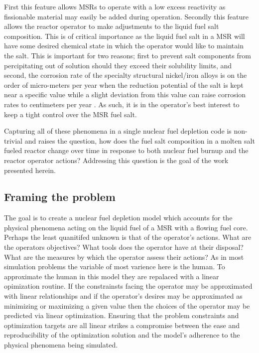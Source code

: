 First this feature allows MSRs to operate with a
low excess reactivity as fissionable material may easily be added during
operation. Secondly this feature allows the reactor operator to make adjustments
to the liquid fuel salt composition. This is of critical importance as the 
liquid fuel salt in a MSR will have some desired chemical state
in which the operator would like to maintain the salt. This is important for two
reasons; first to prevent salt components from percipitating out of solution
should they exceed their solubility limits, and second, the corrosion rate of 
the specialty structural nickel/iron alloys is on the order of
micro-meters per year when the reduction potential of the salt is kept near
a specific value while a slight deviation from this value can raise corrosion
rates to centimeters per year \cite{Corrosion}. 
As such, it is in the operator's best interest to keep a tight control over 
the MSR fuel salt.

Capturing all of these phenomena in a single nuclear fuel depletion code is
non-trivial and raises the question, how does the fuel salt composition in a 
molten salt fueled reactor change over time in response to both nuclear fuel
burnup and the reactor operator actions? Addressing this question is the goal
of the work presented herein. 

\subsection{Framing the problem}

The goal is to create a nuclear fuel depletion model which accounts for the
physical phenomena acting on the liquid fuel of a MSR with a flowing fuel core.
Perhaps the least quanitifed unknown is that of the operator's actions. What are
the operators objectives? What tools does the operator have at their disposal?
What are the measures by which the operator assess their actions? As in most
simulation problems the variable of most varience here is the human. To
approximate the human in this model they are repalaced with a linear opimization
routine. If the constrainsts facing the operator may be approximated with linear
 relationships and if the operator's desires may be approximated as minimizing
or maximizing a given value then the choices of the operator may be predicted
via linear optimization. Ensuring that the problem constraints and optimization 
targets are all linear strikes a compromise between the ease and reproducibility
of the optimization solution and the model's adherence to the physical 
phenomena being simulated.

